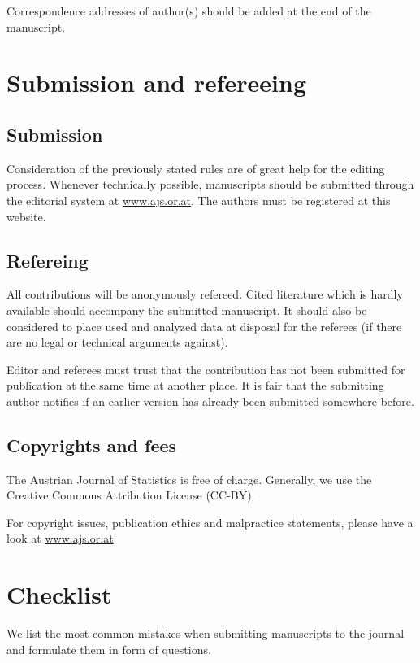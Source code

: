 \documentclass[article]{ajs}
\begin{document}
Correspondence addresses of author(s) should be added at the end
of the manuscript. 


\section{Submission and refereeing}


\subsection{Submission}

Consideration of the previously stated rules are of great help for
the editing process. Whenever technically possible, manuscripts
should be submitted through the editorial system at \href{www.ajs.or.at}{www.ajs.or.at}. The authors must be registered at this website.

\subsection{Refereing}

All contributions will be anonymously refereed. Cited literature which is
hardly available should accompany the submitted manuscript. It
should also be considered to place used and analyzed data at
disposal for the referees (if there are no legal or technical
arguments against).

Editor and referees must trust that the contribution has not been
submitted for publication at the same time at another place. It is
fair that the submitting author notifies if an earlier version has
already been submitted somewhere before.

\subsection{Copyrights and fees}

The Austrian Journal of Statistics is free of
charge. Generally, we use the Creative Commons Attribution License (CC-BY).

For copyright issues, publication ethics and malpractice statements, please have a look at 
\href{www.ajs.or.at}{www.ajs.or.at}


\section{Checklist}

We list the most common mistakes when submitting manuscripts to the journal and formulate them in form of questions.
\end{document}
